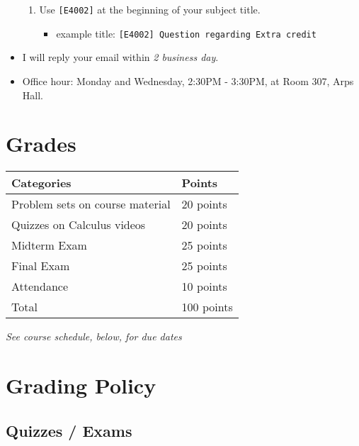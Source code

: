 \documentclass[12pt]{article}
\begin{document}
\begin{itemize}
\begin{enumerate}
        \item Use \texttt{[E4002]} at the beginning of your subject title.
        \begin{itemize}
            \item example title: \texttt{[E4002] Question regarding Extra credit}
        \end{itemize}
    \end{enumerate}
    \item I will reply your email within \textit{2 business day}.
    \item Office hour: Monday and Wednesday, 2:30PM - 3:30PM, at Room 307, Arps Hall.
\end{itemize}

\newpage

\section*{Grades}

\newlength\q
\setlength{}
\begin{tabular}{|p{\q}|p{\q}|}
    \hline
    Categories  & Points \\
    \hline
    \hline
    Problem sets on course material   & 20 points \\
    \hline
    Quizzes on Calculus videos & 20 points \\
    \hline
    Midterm Exam & 25 points \\
    \hline
    Final Exam & 25 points \\
    \hline
    Attendance & 10 points \\
    \hline
    Total & 100 points \\
    \hline
\end{tabular}
\textit{See course schedule, below, for due dates}


\section*{Grading Policy}

\subsection*{Quizzes / Exams}
\end{document}
